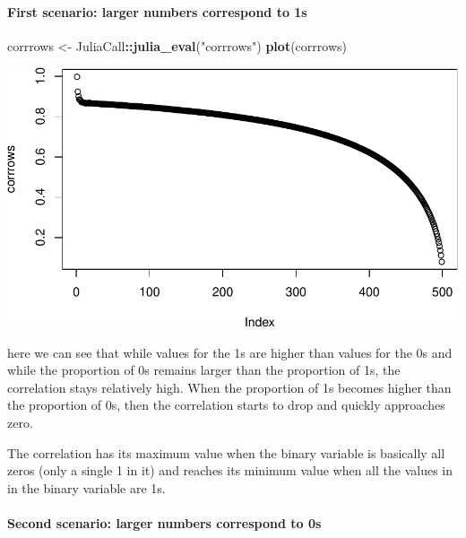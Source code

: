 \documentclass[]{article}
\newenvironment{Shaded}{\begin{snugshade}}{\end{snugshade}}
\newcommand{\KeywordTok}[1]{\textcolor[rgb]{0.13,0.29,0.53}{\textbf{#1}}}
\newcommand{\NormalTok}[1]{#1}
\newcommand{\OperatorTok}[1]{\textcolor[rgb]{0.81,0.36,0.00}{\textbf{#1}}}
\newcommand{\StringTok}[1]{\textcolor[rgb]{0.31,0.60,0.02}{#1}}
\let\oldparagraph\paragraph
\renewcommand{\paragraph}[1]{\oldparagraph{#1}\mbox{}}
\begin{document}
\hypertarget{first-scenario-larger-numbers-correspond-to-1s-1}{%
\paragraph{First scenario: larger numbers correspond to
1s}\label{first-scenario-larger-numbers-correspond-to-1s-1}}

\begin{Shaded}
\begin{Highlighting}[]
\NormalTok{corrrows <-}\StringTok{ }\NormalTok{JuliaCall}\OperatorTok{::}\KeywordTok{julia_eval}\NormalTok{(}\StringTok{"corrrows"}\NormalTok{)}
\KeywordTok{plot}\NormalTok{(corrrows)}
\end{Highlighting}
\end{Shaded}

\includegraphics{./figures/unnamed-chunk-16-1.pdf}

here we can see that while values for the 1s are higher than values for
the 0s and while the proportion of 0s remains larger than the proportion
of 1s, the correlation stays relatively high. When the proportion of 1s
becomes higher than the proportion of 0s, then the correlation starts to
drop and quickly approaches zero.

The correlation has its maximum value when the binary variable is
basically all zeros (only a single 1 in it) and reaches its minimum
value when all the values in in the binary variable are 1s.

\newpage

\hypertarget{second-scenario-larger-numbers-correspond-to-0s-1}{%
\paragraph{Second scenario: larger numbers correspond to
0s}\label{second-scenario-larger-numbers-correspond-to-0s-1}}
\end{document}
